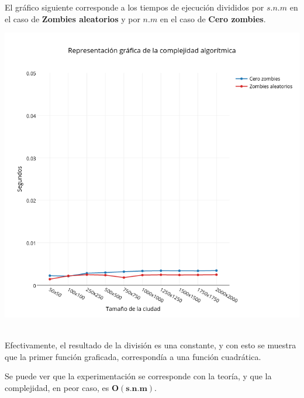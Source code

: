 \newpage

El gr\'afico siguiente corresponde a los tiempos de ejecuci\'on divididos por $s.n.m$ en el caso de \textbf{Zombies aleatorios}  y por $n.m$ en el caso de \textbf{Cero zombies}.

\includegraphics[width=15cm,keepaspectratio=yes]{imagenes/ej2/constantizacion.png}\

Efectivamente, el resultado de la división es una constante, y con esto se muestra que la primer función graficada, correspondía a una función cuadrática.

\bigskip

Se puede ver que la experimentación se corresponde con la teoría, y que la complejidad, en peor caso, es $\mathbf{O(s.n.m)}$.

